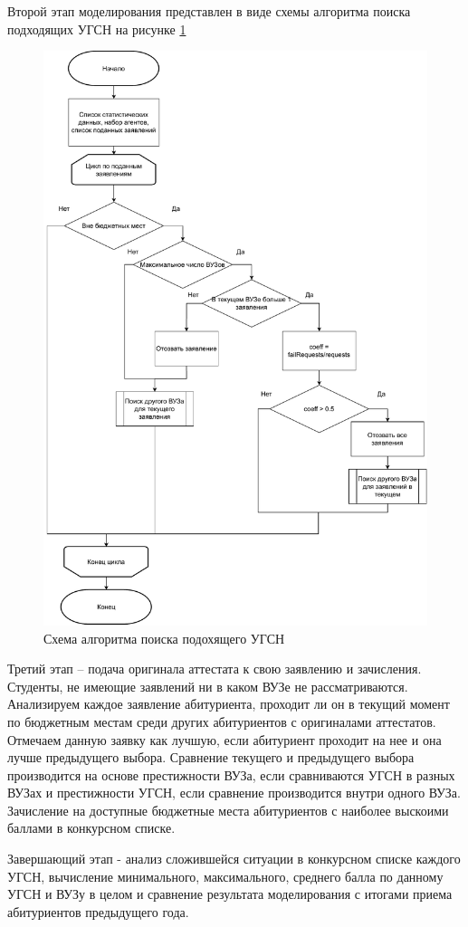 Второй этап моделирования представлен в виде схемы алгоритма поиска подходящих УГСН на рисунке \ref{scheme:find}

\begin{figure}[hbtp]
	\centering
	\includegraphics[scale=0.6]{idef0/find.pdf}
	\caption{Схема алгоритма поиска подохящего УГСН}
	\label{scheme:find}
\end{figure}


Третий этап – подача оригинала аттестата к свою заявлению и зачисления. Студенты, не имеющие заявлений ни в каком ВУЗе не рассматриваются. Анализируем каждое заявление абитуриента, проходит ли он в текущий момент по бюджетным местам среди других абитуриентов с оригиналами аттестатов. Отмечаем данную заявку как лучшую, если абитуриент проходит на нее и она лучше предыдущего выбора. Сравнение текущего и предыдущего выбора производится на основе престижности ВУЗа, если сравниваются УГСН в разных ВУЗах и престижности УГСН, если сравнение производится внутри одного ВУЗа. Зачисление на доступные бюджетные места абитуриентов с наиболее выскоими баллами в конкурсном списке.

Завершающий этап - анализ сложившейся ситуации в конкурсном списке каждого УГСН, вычисление минимального, максимального, среднего балла по данному УГСН и ВУЗу в целом и сравнение результата моделирования с итогами приема абитуриентов предыдущего года.





















\pagebreak